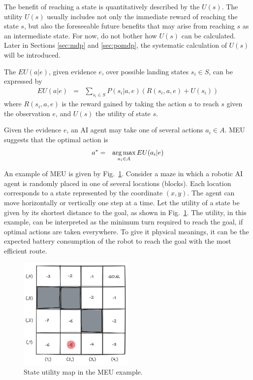 The benefit of reaching a state is quantitatively described by the  $U(s)$. The utility $U(s)$ usually includes not only the immediate reward of reaching the state $s$, but also the foreseeable future benefits that may arise from reaching $s$ as an intermediate state. For now, do not bother how $U(s)$ can be calculated. Later in Sections \ref{sec:mdp} and \ref{sec:pomdp}, the systematic calculation of $U(s)$ will be introduced.

The  $EU(a|e)$, given evidence $e$, over possible landing states $s_i \in S$, can be expressed by
\begin{eqnarray}
	EU(a|e) &=& \sum_{s_i \in S} P(s_i|a,e) \left(R(s_i,a,e) + U(s_i)\right) \label{eq:expected_utility}
\end{eqnarray}
where $R(s_i,a,e)$ is the reward gained by taking the action $a$ to reach $s$ given the observation $e$, and $U(s)$ the utility of state $s$. 

Given the evidence $e$, an AI agent may take one of several actions $a_i \in A$. MEU suggests that the optimal action is
\begin{eqnarray}
	a^* &=& \operatorname*{arg\,max}_{a_i \in A} EU(a_i|e) \label{eq:emu}
\end{eqnarray}

An example of MEU is given by Fig.~\ref{fig:emuexp}. Consider a maze in which a robotic AI agent is randomly placed in one of several locations (blocks). Each location corresponds to a state represented by the coordinate $(x,y)$. The agent can move horizontally or vertically one step at a time. Let the utility of a state be given by its shortest distance to the goal, as shown in Fig.~\ref{fig:emuexp}. The utility, in this example, can be interpreted as the minimum turn required to reach the goal, if optimal actions are taken everywhere. To give it physical meanings, it can be the expected battery consumption of the robot to reach the goal with the most efficient route.

\begin{figure}[!htb]
	\centering
	\includegraphics[width=0.5\textwidth]{./chapters/part-1/figures/emuexp.png}
	\caption{State utility map in the MEU example.}
	\label{fig:emuexp}
\end{figure}

